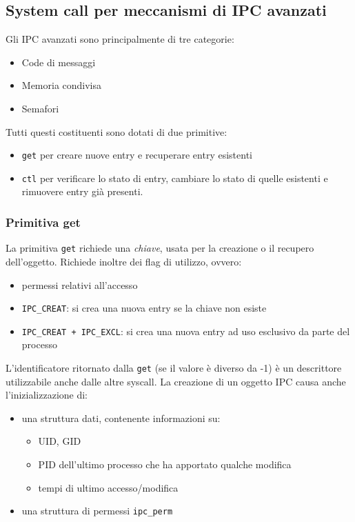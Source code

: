 \documentclass[a4paper]{article}
\begin{document}
\subsection{System call per meccanismi di IPC avanzati}
Gli IPC avanzati sono principalmente di tre categorie:
\begin{itemize}
\item Code di messaggi
\item Memoria condivisa
\item Semafori
\end{itemize}
Tutti questi costituenti sono dotati di due primitive:
\begin{itemize}
\item \verb|get| per creare nuove entry e recuperare entry esistenti
\item \verb|ctl| per verificare lo stato di entry, cambiare lo stato di quelle esistenti e rimuovere entry già presenti.
\end{itemize}

\subsubsection{Primitiva get}
La primitiva \verb|get| richiede una \textit{chiave}, usata per la creazione o il recupero dell'oggetto. Richiede inoltre dei flag di utilizzo, ovvero:
\begin{itemize}
\item permessi relativi all'accesso
\item \verb|IPC_CREAT|: si crea una nuova entry se la chiave non esiste
\item \verb|IPC_CREAT + IPC_EXCL|: si crea una nuova entry ad uso esclusivo da parte del processo
\end{itemize}
L'identificatore ritornato dalla \verb|get| (se il valore è diverso da -1) è un descrittore utilizzabile anche dalle altre syscall.
La creazione di un oggetto IPC causa anche l'inizializzazione di:
\begin{itemize}
\item una struttura dati, contenente informazioni su:
\begin{itemize}
\item UID, GID
\item PID dell'ultimo processo che ha apportato qualche modifica
\item tempi di ultimo accesso/modifica
\end{itemize}
\item una struttura di permessi \verb|ipc_perm|
\end{itemize}
\end{document}
